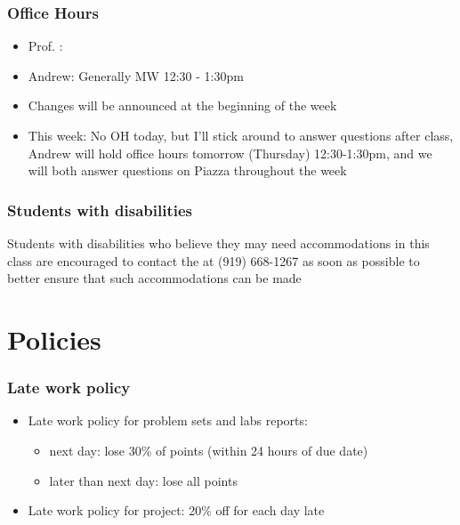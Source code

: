 \documentclass[slidestop,compress,mathserif,12pt,t,professionalfonts,xcolor=table]{beamer}
\begin{document}

\begin{frame}
\frametitle{Office Hours}

\begin{itemize}
\item Prof. \LastName{}: \OfficeHours{}
\item Andrew: Generally MW 12:30 - 1:30pm
\item Changes will be announced at the beginning of the week
\item This week: No OH today, but I'll stick around to answer questions after class, Andrew will hold office hours tomorrow (Thursday) 12:30-1:30pm, and we will both answer questions on Piazza throughout the week
\end{itemize}

\end{frame}


\begin{frame}
\frametitle{Students with disabilities}

Students with disabilities who believe they may need accommodations in this class are encouraged to contact the  at (919) 668-1267 as soon as possible to better ensure that such accommodations can be made

\vfill


\end{frame}


\section{Policies}


\begin{frame}
\frametitle{Late work policy}

\begin{itemize}

\item Late work policy for problem sets and labs reports:
\begin{itemize}
\item next day: lose 30\% of points (within 24 hours of due date)
\item later than next day: lose all points
\end{itemize}

\item Late work policy for project: 20\% off for each day late

\end{itemize}

\end{frame}
\end{document}
